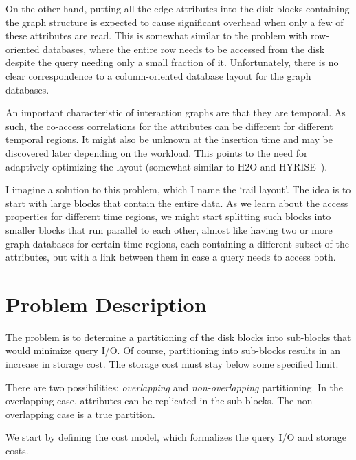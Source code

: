 \documentclass[twocolumn]{svjour3}          %
\begin{document}
On the other hand, putting all the edge attributes into the disk blocks
containing the graph structure is expected to cause significant overhead when
only a few of these attributes are read. This is somewhat similar to the 
problem with row-oriented databases, where the entire row needs to be accessed
from the disk despite the query needing only a small fraction of it.
Unfortunately, there is no clear correspondence to a column-oriented database
layout for the graph databases.%

An important characteristic of interaction graphs are that they are temporal.
As such, the co-access correlations for the attributes can be different for
different temporal regions. It might also be unknown at the insertion time and
may be discovered later depending on the workload. This points to the need for
adaptively optimizing the layout (somewhat similar to H2O \cite{alagiannis14}
and HYRISE~\cite{grund10}).%

I imagine a solution to this problem, which I name the `rail layout'. The idea
is to start with large blocks that contain the entire data. As we learn about
the access properties for different time regions, we might start splitting
such blocks into smaller blocks that run parallel to each other, almost like
having two or more graph databases for certain time regions, each containing a
 different subset of the attributes, but with a link between them in case a
query needs to access both.

\section{Problem Description}

The problem is to determine a partitioning of the disk blocks into sub-blocks
that would minimize query I/O. Of course, partitioning into sub-blocks results
in an increase in storage cost. The storage cost must stay below some
specified limit.

There are two possibilities: \emph{overlapping} and \emph{non-overlapping}
partitioning. In the overlapping case, attributes can be replicated in the
sub-blocks. The non-overlapping case is a true partition.

We start by defining the cost model, which formalizes the query I/O and storage
costs.
\end{document}

